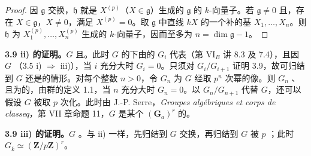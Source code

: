 \begin{proof}
因 $\mathfrak g$ 交换，$\mathfrak h$ 就是 $X^{(p)}$（$X\in\mathfrak g$）生成的 $\mathfrak g$ 的 $k$-向量子。若 $\mathfrak g\ne0$ 且，存在 $X\in\mathfrak g$，$X\ne0$，满足 $X^{(p)}=0$。取 $\mathfrak g$ 中直线 $kX$ 的一个补的基 $X_1,\ldots,X_n$。则 $\mathfrak h$ 为 $X_1^{(p)},\ldots,X_n^{(p)}$ 生成的 $k$-向量子，因而至多为 $n=\dim\mathfrak g-1$。
\end{proof}
\textbf{3.9 ii) 的证明。}$G$ 且。此时 $G$ 的下由的 $G_i$ 代表（第 VI$_B$ 讲 8.3 及 7.4），且因 $G$ （3.5 i) $\Rightarrow$ iii)），当 $i$ 充分大时 $G_i=0$。只须对 $G_i/G_{i+1}$ 证明 3.9，故可归结到 $G$ 还是的情形。对每个整数 $n>0$，令 $G_n$ 为 $G$ 经取 $p^n$ 次幂的像。则 $G_n$ 、且为的，由群的定义 1.1，当 $n$ 充分大时 $G_n=0$。以 $G_n/G_{n+1}$ 代替 $G$，还可以假设 $G$ 被取 $p$ 次化。此时由 J.-P. Serre，\textit{Groupes algébriques et corps de classeq}，第 VII 章命题 11，$G$ 是某个 $(\mathbf G_a)^r$ 的。

\textbf{3.9 iii) 的证明。}$G$ 。与 ii) 一样，先归结到 $G$ 交换，再归结到 $G$ 被 $p$ ；此时 $G_{\overline k}\simeq(\mathbf Z/p\mathbf Z)^r$。

